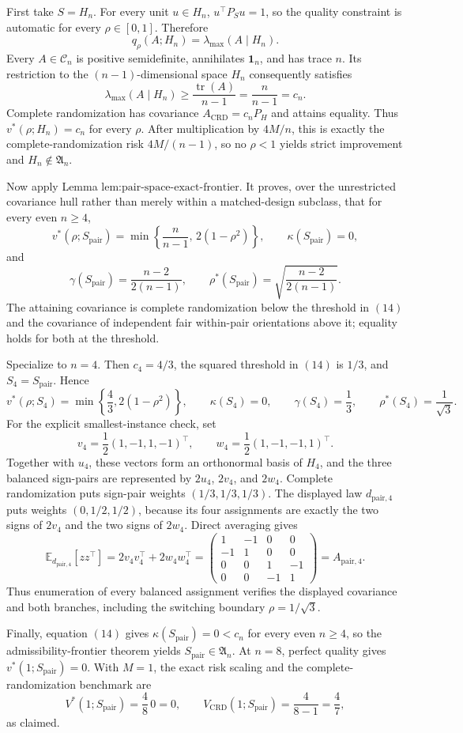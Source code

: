 First take \(S=H_n\).  For every unit \(u\in H_n\), \(u^\top P_Su=1\), so the quality constraint is automatic for every \(\rho\in[0,1]\).  Therefore
\[
q_\rho(A;H_n)=\lambda_{\max}(A\mid H_n).
\]
Every \(A\in\mathcal C_n\) is positive semidefinite, annihilates \(\mathbf1_n\), and has trace \(n\).  Its restriction to the \((n-1)\)-dimensional space \(H_n\) consequently satisfies
\[
\lambda_{\max}(A\mid H_n)\geq\frac{\operatorname{tr}(A)}{n-1}
=\frac{n}{n-1}=c_n.
\]
Complete randomization has covariance \(A_{\mathrm{CRD}}=c_nP_H\) and attains equality.  Thus \(v^*(\rho;H_n)=c_n\) for every \(\rho\).  After multiplication by \(4M/n\), this is exactly the complete-randomization risk \(4M/(n-1)\), so no \(\rho<1\) yields strict improvement and \(H_n\notin\mathfrak A_n\).

Now apply Lemma \(\text{lem:pair-space-exact-frontier}\).  It proves, over the unrestricted covariance hull rather than merely within a matched-design subclass, that for every even \(n\geq4\),
\[
v^*(\rho;S_{\mathrm{pair}})
=\min\left\{\frac{n}{n-1},\,2(1-\rho^2)\right\},
\qquad
\kappa(S_{\mathrm{pair}})=0,
\]
and
\[
\gamma(S_{\mathrm{pair}})=\frac{n-2}{2(n-1)},
\qquad
\rho^*(S_{\mathrm{pair}})
=\sqrt{\frac{n-2}{2(n-1)}}.
\tag{14}
\]
The attaining covariance is complete randomization below the threshold in \((14)\) and the covariance of independent fair within-pair orientations above it; equality holds for both at the threshold.

Specialize to \(n=4\).  Then \(c_4=4/3\), the squared threshold in \((14)\) is \(1/3\), and \(S_4=S_{\mathrm{pair}}\).  Hence
\[
v^*(\rho;S_4)=\min\left\{\frac43,2(1-\rho^2)\right\},
\qquad
\kappa(S_4)=0,
\qquad
\gamma(S_4)=\frac13,
\qquad
\rho^*(S_4)=\frac1{\sqrt3}.
\]
For the explicit smallest-instance check, set
\[
v_4=\frac12(1,-1,1,-1)^\top,
\qquad
w_4=\frac12(1,-1,-1,1)^\top.
\]
Together with \(u_4\), these vectors form an orthonormal basis of \(H_4\), and the three balanced sign-pairs are represented by \(2u_4\), \(2v_4\), and \(2w_4\).  Complete randomization puts sign-pair weights \((1/3,1/3,1/3)\).  The displayed law \(d_{\mathrm{pair},4}\) puts weights \((0,1/2,1/2)\), because its four assignments are exactly the two signs of \(2v_4\) and the two signs of \(2w_4\).  Direct averaging gives
\[
\mathbb E_{d_{\mathrm{pair},4}}[zz^\top]
=2v_4v_4^\top+2w_4w_4^\top
=\begin{pmatrix}
1&-1&0&0\\
-1&1&0&0\\
0&0&1&-1\\
0&0&-1&1
\end{pmatrix}
=A_{\mathrm{pair},4}.
\]
Thus enumeration of every balanced assignment verifies the displayed covariance and both branches, including the switching boundary \(\rho=1/\sqrt3\).

Finally, equation \((14)\) gives \(\kappa(S_{\mathrm{pair}})=0<c_n\) for every even \(n\geq4\), so the admissibility-frontier theorem yields \(S_{\mathrm{pair}}\in\mathfrak A_n\).  At \(n=8\), perfect quality gives \(v^*(1;S_{\mathrm{pair}})=0\).  With \(M=1\), the exact risk scaling and the complete-randomization benchmark are
\[
V^*(1;S_{\mathrm{pair}})=\frac4{8}\,0=0,
\qquad
V_{\mathrm{CRD}}(1;S_{\mathrm{pair}})=\frac4{8-1}=\frac47,
\]
as claimed.
